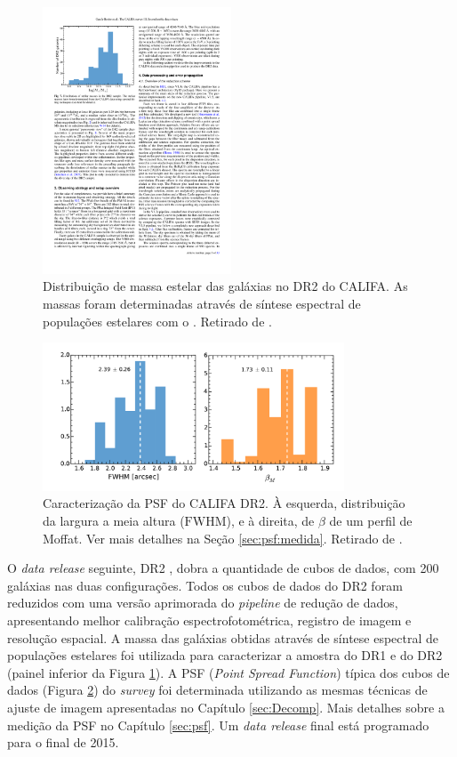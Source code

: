 \begin{figure}
	\includegraphics[width=0.5\textwidth]{figuras/CALIFAMass}
	\caption[Distribuição de massa das galáxias no  DR2 do CALIFA.]
	{Distribuição de massa estelar das galáxias no DR2 do CALIFA. As massas
	foram determinadas através de síntese espectral de populações estelares com o
	\starlight. Retirado de \citet{GarciaBenito2015}.}
	\label{fig:DRMass}
\end{figure}

\begin{figure}
	\includegraphics[width=0.8\textwidth]{figuras/DR2PSF}
	\caption[Caracterização da PSF do CALIFA DR2.]
	{Caracterização da PSF do CALIFA DR2. À esquerda, distribuição da largura a
	meia altura ($\mathrm{FWHM}$), e à direita, de $\beta$ de um perfil de Moffat.
	Ver mais detalhes na Seção \ref{sec:psf:medida}. Retirado de
	\citet{GarciaBenito2015}.}
	\label{fig:DR2PSF}
\end{figure}

O {\em data release} seguinte, DR2 \citep{GarciaBenito2015}, dobra a quantidade
de cubos de dados, com 200 galáxias nas duas configurações. Todos os cubos de
dados do DR2 foram reduzidos com uma versão aprimorada do {\em pipeline} de
redução de dados, apresentando melhor calibração espectrofotométrica, registro
de imagem e resolução espacial. A massa das galáxias obtidas através de síntese
espectral de populações estelares foi utilizada para caracterizar a amostra do
DR1 e do DR2 (painel inferior da Figura \ref{fig:DRMass}).
A PSF ({\em Point Spread Function}) típica dos cubos de dados (Figura
\ref{fig:DR2PSF}) do {\em survey} foi determinada utilizando as mesmas técnicas
de ajuste de imagem apresentadas no Capítulo \ref{sec:Decomp}. Mais detalhes
sobre a medição da PSF no Capítulo \ref{sec:psf}. Um {\em data release} final
está programado para o final de 2015.


